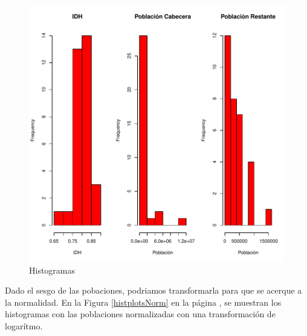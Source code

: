 \documentclass{article}
\begin{document}
\begin{figure}[h]
\centering
\begin{adjustbox}{width=7cm,height=7cm,clip,trim=1.5cm 0.5cm 0cm 1.5cm}
\includegraphics{paper_version1-histograms}
\end{adjustbox}
\caption{Histogramas}
\label{histplots}
\end{figure}

Dado el sesgo de las pobaciones, podriamos transformarla para que se acerque a la normalidad. En la Figura \ref{histplotsNorm} en la página \pageref{histplotsNorm}, se muestran los histogramas con las poblaciones normalizadas con una transformación de logarítmo. 
\end{document}
